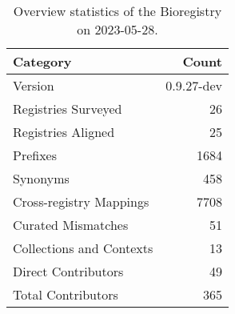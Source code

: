 \begin{table}
\caption{Overview statistics of the Bioregistry on 2023-05-28.}
\label{tab:bioregistry-summary}
\begin{tabular}{lr}
\toprule
Category & Count \\
\midrule
Version & 0.9.27-dev \\
Registries Surveyed & 26 \\
Registries Aligned & 25 \\
Prefixes & 1684 \\
Synonyms & 458 \\
Cross-registry Mappings & 7708 \\
Curated Mismatches & 51 \\
Collections and Contexts & 13 \\
Direct Contributors & 49 \\
Total Contributors & 365 \\
\bottomrule
\end{tabular}
\end{table}
